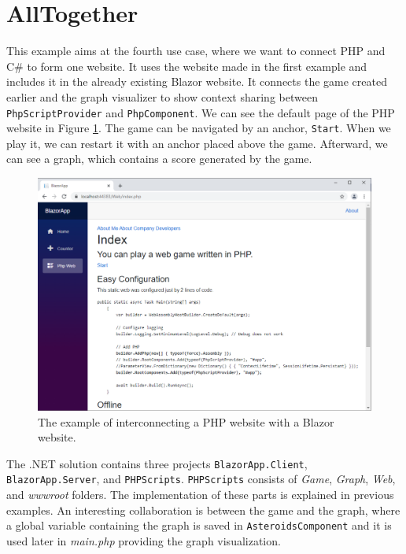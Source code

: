 \section{AllTogether}

This example aims at the fourth use case, where we want to connect PHP and C\# to form one website.
It uses the website made in the first example and includes it in the already existing Blazor website.
It connects the game created earlier and the graph visualizer to show context sharing between \texttt{PhpScriptProvider} and \texttt{PhpComponent}.
We can see the default page of the PHP website in Figure \ref{img30:allTogether}.
The game can be navigated by an anchor, \texttt{Start}.
When we play it, we can restart it with an anchor placed above the game.
Afterward, we can see a graph, which contains a score generated by the game. 
\par
\begin{figure}[b!]
\centering
\includegraphics[scale=0.5]{./img/AllTogether}
\caption{The example of interconnecting a PHP website with a Blazor website.}
\label{img30:allTogether}
\end{figure} 
\par
The .NET solution contains three projects \texttt{BlazorApp.Client}, \texttt{BlazorApp.Server}, and \texttt{PHPScripts}.
\texttt{PHPScripts} consists of \textit{Game}, \textit{Graph}, \textit{Web}, and \textit{wwwroot} folders.
The implementation of these parts is explained in previous examples.
An interesting collaboration is between the game and the graph, where a global variable containing the graph is saved in \texttt{AsteroidsComponent} and it is used later in \textit{main.php} providing the graph visualization.
